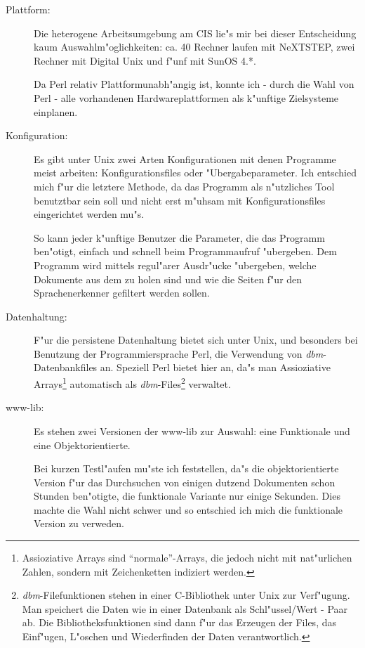 \begin{description}
	\item[Plattform:]	Die heterogene Arbeitsumgebung am CIS lie"s mir bei dieser Entscheidung kaum Auswahlm"oglichkeiten: ca. 40 Rechner laufen mit NeXTSTEP, zwei Rechner mit Digital Unix und f"unf mit SunOS 4.*. 
	
	Da Perl relativ Plattformunabh"angig ist, konnte ich - durch die Wahl von Perl - alle vorhandenen Hardwareplattformen als k"unftige Zielsysteme einplanen.
	
	\item[Konfiguration:]	Es gibt unter Unix zwei Arten Konfigurationen mit denen Programme meist arbeiten: Konfigurationsfiles oder "Ubergabeparameter. Ich entschied mich f"ur die letztere Methode, da das Programm als n"utzliches Tool benutztbar sein soll und nicht erst m"uhsam mit Konfigurationsfiles eingerichtet werden mu"s.
	
	So kann jeder k"unftige Benutzer die Parameter, die das Programm ben"otigt, einfach und schnell beim Programmaufruf "ubergeben.
	Dem Programm wird mittels regul"arer Ausdr"ucke "ubergeben, welche Dokumente aus dem \www zu holen sind und wie die Seiten f"ur den Sprachenerkenner gefiltert werden sollen.
	
	\item[Datenhaltung:]	F"ur die persistene Datenhaltung bietet sich unter Unix, und besonders bei Benutzung der Programmiersprache Perl, die Verwendung von {\em dbm}-Datenbankfiles an. Speziell Perl bietet hier an, da"s man Assioziative Arrays\footnote{Assioziative Arrays sind "`normale"'-Arrays, die jedoch nicht mit nat"urlichen Zahlen, sondern mit Zeichenketten indiziert werden.} automatisch als {\em dbm}-Files\footnote{{\em dbm}-Filefunktionen stehen in einer C-Bibliothek unter Unix zur Verf"ugung. Man speichert die Daten wie in einer Datenbank als Schl"ussel/Wert - Paar ab. Die Bibliotheksfunktionen sind dann f"ur das Erzeugen der Files, das Einf"ugen, L"oschen und Wiederfinden der Daten verantwortlich.} verwaltet.
	
	\item[www-lib:]	Es stehen zwei Versionen der www-lib zur Auswahl: eine Funktionale und eine Objektorientierte.
	
	Bei kurzen Testl"aufen mu"ste ich feststellen, da"s die objektorientierte Version f"ur das Durchsuchen von einigen dutzend Dokumenten schon Stunden ben"otigte, die funktionale Variante nur einige Sekunden. Dies machte die Wahl nicht schwer und so entschied ich mich die funktionale Version zu verweden.
	

\end{description}
